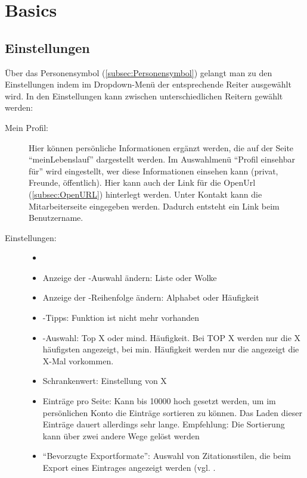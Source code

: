 \chapter{Basics}
\label{ch:basics}
\section{Einstellungen}
\label{sec:einstellungen}
Über das Personensymbol (\autoref{subsec:Personensymbol}) gelangt man zu den Einstellungen indem im Dropdown-Menü der entsprechende Reiter ausgewählt wird. In den Einstellungen kann zwischen unterschiedlichen Reitern gewählt werden:
\begin{description}
   \item[Mein Profil:]\label{MeinProfil}
	\item[]
Hier können persönliche Informationen ergänzt werden, die auf der Seite \enquote{meinLebenslauf} dargestellt werden. Im Auswahlmenü \enquote{Profil einsehbar für} wird eingestellt, wer diese Informationen einsehen kann (privat, Freunde, öffentlich). Hier kann auch der Link für die OpenUrl (\autoref{subsec:OpenURL}) hinterlegt werden. Unter Kontakt kann die Mitarbeiterseite eingegeben werden. Dadurch entsteht ein Link beim Benutzername.
   \item[Einstellungen:] 
   \begin{itemize}
      \item[] %
      \item Anzeige der \tag-Auswahl ändern: Liste oder Wolke
      \item Anzeige der \tag-Reihenfolge ändern: Alphabet oder Häufigkeit
      \item \tag-Tipps: Funktion ist nicht mehr vorhanden
      \item \tag-Auswahl: Top X oder mind. Häufigkeit. Bei TOP X werden nur die X häufigsten \tags angezeigt, bei min. Häufigkeit werden nur die \tags angezeigt die X-Mal vorkommen.
      \item Schrankenwert: Einstellung von X
      \item Einträge pro Seite: Kann bis 10000 hoch gesetzt werden, um im persönlichen Konto die Einträge sortieren zu können. Das Laden dieser Einträge dauert allerdings sehr lange. Empfehlung: Die Sortierung kann über zwei andere Wege gelöst werden 
      \item \enquote{Bevorzugte Exportformate}: \label{item:bevExpoForm} Auswahl von Zitationsstilen, die beim Export eines Eintrages angezeigt werden (vgl. \autocite{sec:EExpo}.

\end{itemize}
\end{description}

